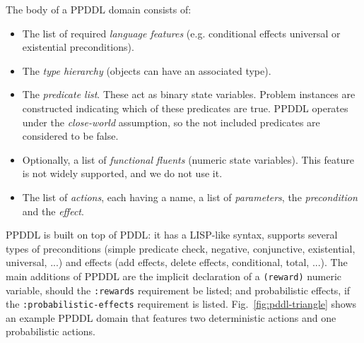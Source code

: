 \documentclass[../root.tex]{subfiles}
\begin{document}
The body of a PPDDL domain consists of:
\begin{itemize}
	\item The list of required \emph{language features} (e.g. conditional effects
	universal or existential preconditions).
	\item The \emph{type hierarchy} (objects can have an associated type).
	\item The \emph{predicate list}. These act as binary state variables. Problem
	instances are constructed indicating which of these predicates are true. PPDDL
	operates under the \emph{close-world} assumption, so the not included predicates
	are considered to be false.
	\item Optionally, a list of \emph{functional fluents} (numeric state variables).
	This feature is not widely supported, and we do not use it.
	\item The list of \emph{actions}, each having a name, a list of \emph{parameters},
	the \emph{precondition} and the \emph{effect}.
\end{itemize}

PPDDL is built on top of PDDL: it has a LISP-like syntax, supports several types
of preconditions (simple predicate check, negative, conjunctive,
existential, universal, ...)
and effects (add effects, delete effects, conditional, total, ...). The main
additions of PPDDL are the implicit declaration of a \texttt{(reward)}
numeric variable,
should the \texttt{:rewards} requirement be listed; and probabilistic
effects, if the \texttt{:probabilistic-effects} requirement is listed. Fig.~\ref{fig:pddl-triangle} shows an example PPDDL domain that features two
deterministic actions and one probabilistic actions.
\end{document}

